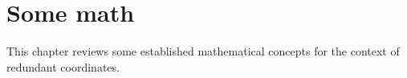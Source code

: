 \chapter{Some math}\label{chap:Math}
This chapter reviews some established mathematical concepts for the context of redundant coordinates.